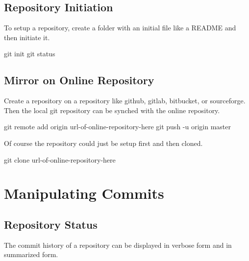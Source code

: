 \documentclass[]{book}
\newenvironment{Shaded}{\begin{snugshade}}{\end{snugshade}}
\newcommand{\FunctionTok}[1]{\textcolor[rgb]{0.00,0.00,0.00}{#1}}
\newcommand{\NormalTok}[1]{#1}
\begin{document}
\subsection{Repository Initiation}\label{repository-initiation}

To setup a repository, create a folder with an initial file like a
README and then initiate it.

\begin{Shaded}
\begin{Highlighting}[]
\FunctionTok{git}\NormalTok{ init}
\FunctionTok{git}\NormalTok{ status}
\end{Highlighting}
\end{Shaded}

\subsection{Mirror on Online
Repository}\label{mirror-on-online-repository}

Create a repository on a repository like github, gitlab, bitbucket, or
sourceforge. Then the local git repository can be synched with the
online repository.

\begin{Shaded}
\begin{Highlighting}[]
\FunctionTok{git}\NormalTok{ remote add origin url-of-online-repository-here}
\FunctionTok{git}\NormalTok{ push -u origin master}
\end{Highlighting}
\end{Shaded}

Of course the repository could just be setup first and then cloned.

\begin{Shaded}
\begin{Highlighting}[]
\FunctionTok{git}\NormalTok{ clone url-of-online-repository-here}
\end{Highlighting}
\end{Shaded}

\section{Manipulating Commits}\label{manipulating-commits}

\subsection{Repository Status}\label{repository-status}

The commit history of a repository can be displayed in verbose form and
in summarized form.
\end{document}
